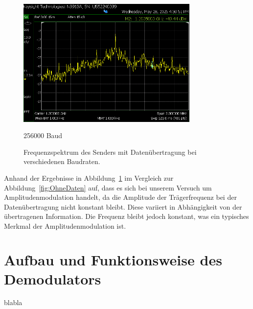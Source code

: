 \begin{figure}[H]
        \vspace{0.5cm}
        \begin{minipage}{0.1\textwidth}
        \end{minipage}
        \hfill
        \begin{minipage}{0.47\textwidth}
            \centering
            \includegraphics[width=0.8\textwidth]{Pictures/4.4C.256000.png}
            \caption*{256000 Baud}
        \end{minipage}
        \hfill
        \begin{minipage}{0.1\textwidth}
        \end{minipage}

        \caption{Frequenzspektrum des Senders mit Datenübertragung bei verschiedenen Baudraten.}
        \label{fig:MitDaten}
    \end{figure}

Anhand der Ergebnisse in Abbildung~\ref{fig:MitDaten} im Vergleich zur Abbildung~\ref{fig:OhneDaten} auf, dass es sich bei unserem Versuch um Amplitudenmodulation handelt, da die Amplitude der Trägerfrequenz bei der Datenübertragung nicht konstant bleibt. Diese variiert in Abhängigkeit von der übertragenen Information. Die Frequenz bleibt jedoch konstant, was ein typisches Merkmal der Amplitudenmodulation ist.
\section{Aufbau und Funktionsweise des Demodulators}
blabla
\clearpage